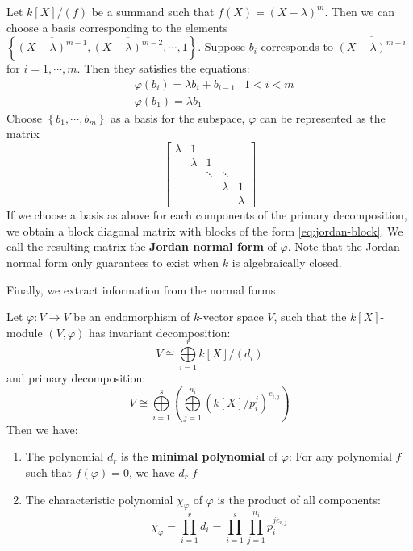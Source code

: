 \documentclass{note-eng}
\begin{document}
Let $k[X] / (f)$ be a summand such that $f(X) = (X - \lambda)^m$. Then we can choose a basis corresponding to the elements $\left\lbrace \overline{(X - \lambda)^{m - 1}}, \overline{(X - \lambda)^{m - 2}}, \cdots, 1 \right\rbrace$. Suppose $b_i$ corresponds to $\overline{(X - \lambda)^{m - i}}$ for $i = 1, \cdots, m$. Then they satisfies the equations:
$$
    \begin{aligned}
    &\varphi(b_i) = \lambda b_i + b_{i - 1} &1 \lt i \lt m \\
    &\varphi(b_{1}) = \lambda b_{1}
    \end{aligned}
$$
Choose $\left\lbrace b_1, \cdots, b_{m} \right\rbrace$ as a basis for the subspace, $\varphi$ can be represented as the matrix
\begin{equation}\label{eq:jordan-block}
    \begin{bmatrix}
        \lambda & 1 \\
        & \lambda & 1\\
        & & \ddots & \ddots \\
        & & &\lambda & 1 \\
        & & & & \lambda
    \end{bmatrix}    
\end{equation}
If we choose a basis as above for each components of the primary decomposition, we obtain a block diagonal matrix with blocks of the form \ref{eq:jordan-block}. We call the resulting matrix the \textbf{Jordan normal form} of $\varphi$. Note that the Jordan normal form only guarantees to exist when $k$ is algebraically closed.

Finally, we extract information from the normal forms:

\begin{proposition}
    Let $\varphi: V \rightarrow V$ be an endomorphism of $k$-vector space $V$, such that the $k[X]$-module $(V, \varphi)$ has invariant decomposition:
    $$V \cong \bigoplus\limits_{i = 1}^{r} k[X] / (d_i)$$
    and primary decomposition:
    $$V \cong \bigoplus\limits_{i = 1}^{s} \left(\bigoplus\limits_{j = 1}^{n_i} (k[X] / p_i^j)^{e_{i, j}}\right)$$
    Then we have:
    \begin{enumerate}
        \item The polynomial $d_r$ is the \textbf{minimal polynomial} of $\varphi$: For any polynomial $f$ such that $f(\varphi) = 0$, we have $d_r | f$
        \item The characteristic polynomial $\chi_{\varphi}$ of $\varphi$ is the product of all components:
        $$\chi_{\varphi} = \prod\limits_{i = 1}^{r} d_i = \prod\limits_{i = 1}^{s} \prod\limits_{j = 1}^{n_i} p_{i}^{j e_{i, j}}$$
    \end{enumerate}
\end{proposition}
\end{document}
